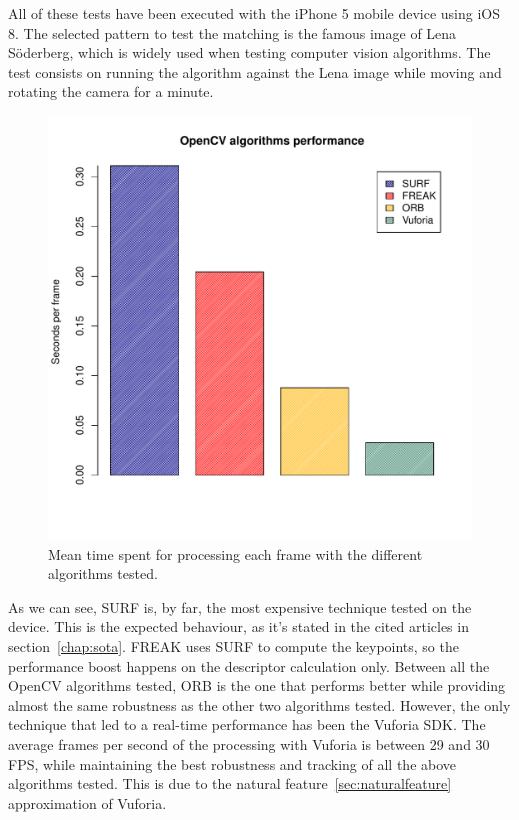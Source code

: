 All of these tests have been executed with the iPhone 5 mobile device using iOS
8. The selected pattern to test the matching is the famous image of Lena Söderberg,
which is widely used when testing computer vision algorithms. The test consists on
running the algorithm against the Lena image while moving and rotating the camera
for a minute.

\begin{figure}
\centering
\includegraphics[scale=0.75]{performance/plot.pdf}
\caption{\label{fig:performance} Mean time spent for processing each frame with the
  different algorithms tested.}
\end{figure} 

As we can see, SURF is, by far, the most expensive technique tested on the device. This is the
expected behaviour, as it's stated in the cited articles in
section~\ref{chap:sota}. FREAK uses SURF to compute 
the keypoints, so the performance boost happens on the descriptor calculation
only. Between all the OpenCV algorithms tested, ORB is the one that performs better
while providing almost the same robustness as the other two algorithms tested.
However, the only technique that led to a real-time performance has been the Vuforia
SDK. The average frames per second of the processing with Vuforia is between 29 and
30 FPS, while maintaining the best robustness and tracking of all the above
algorithms tested. This is due to the natural feature~\ref{sec:naturalfeature}
approximation of Vuforia.

